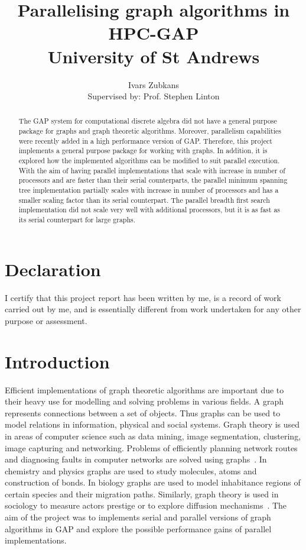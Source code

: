\documentclass{report}
\title{Parallelising graph algorithms in HPC-GAP \\ \vspace{2 mm} {\large University of St Andrews}}
\author{Ivars Zubkans \\ \small Supervised by: Prof. Stephen Linton}
\theoremstyle{plain}
\theoremstyle{definition}
\theoremstyle{remark}
\begin{document}
\maketitle

\begin{abstract}
The GAP system for computational discrete algebra did not have a general purpose package for graphs and graph theoretic algorithms. Moreover, parallelism capabilities were recently added in a high performance version of GAP. Therefore, this project implements a general purpose package for working with graphs. In addition, it is explored how the implemented algorithms can be modified to suit parallel execution. With the aim of having parallel implementations that scale with increase in number of processors and are faster than their serial counterparts, the parallel minimum spanning tree implementation partially scales with increase in number of processors and has a smaller scaling factor than its serial counterpart. The parallel breadth first search implementation did not scale very well with additional processors, but it is as fast as its serial counterpart for large graphs.
\end{abstract}

\chapter*{Declaration}
I certify that this project report has been written by me, is a record of work carried out by me, and is essentially different from work undertaken for any other purpose or assessment.

\tableofcontents

\chapter{Introduction}

Efficient implementations of graph theoretic algorithms are important due to their heavy use for modelling and solving problems in various fields. A graph represents connections between a set of objects. Thus graphs can be used to model relations in information, physical and social systems. Graph theory is used in areas of computer science such as data mining, image segmentation, clustering, image capturing and networking. Problems of efficiently planning network routes and diagnosing faults in computer networks are solved using graphs~\cite{6005872}. In chemistry and physics graphs are used to study molecules, atoms and construction of bonds. In biology graphs are used to model inhabitance regions of certain species and their migration paths. Similarly, graph theory is used in sociology to measure actors prestige or to explore diffusion mechanisms~\cite{shirinivas2010applications}. The aim of the project was to implements serial and parallel versions of graph algorithms in GAP and explore the possible performance gains of parallel implementations.
\end{document}
